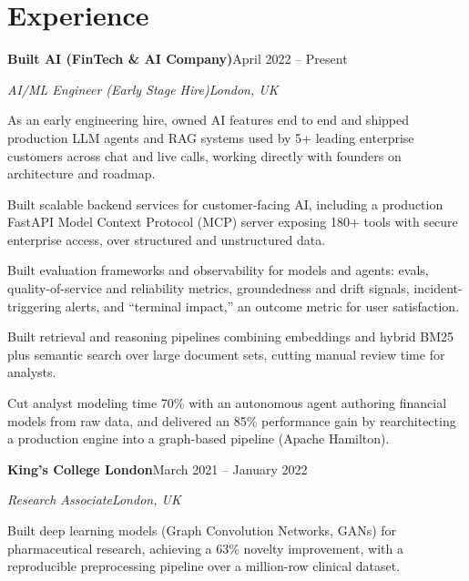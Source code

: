 \documentclass[10pt,a4paper]{article}
\newcommand{\entry}[4]{%
  {\color{company}\bfseries #1}\hfill {\color{muted}#2}\par
  \vspace{1pt}
  {\itshape #3}\hfill {\color{muted}\itshape #4}\par
  \vspace{3pt}%
}
\begin{document}
\section{Experience}
\entry{Built AI (FinTech \& AI Company)}{April 2022 -- Present}{AI/ML Engineer (Early Stage Hire)}{London, UK}
\begin{tight}
  \item As an early engineering hire, owned AI features end to end and shipped production LLM agents and RAG systems used by 5+ leading enterprise customers across chat and live calls, working directly with founders on architecture and roadmap.
  \item Built scalable backend services for customer-facing AI, including a production FastAPI Model Context Protocol (MCP) server exposing 180+ tools with secure enterprise access, over structured and unstructured data.
  \item Built evaluation frameworks and observability for models and agents: evals, quality-of-service and reliability metrics, groundedness and drift signals, incident-triggering alerts, and ``terminal impact,'' an outcome metric for user satisfaction.
  \item Built retrieval and reasoning pipelines combining embeddings and hybrid BM25 plus semantic search over large document sets, cutting manual review time for analysts.
  \item Cut analyst modeling time 70\% with an autonomous agent authoring financial models from raw data, and delivered an 85\% performance gain by rearchitecting a production engine into a graph-based pipeline (Apache Hamilton).
\end{tight}

\entry{King's College London}{March 2021 -- January 2022}{Research Associate}{London, UK}
\begin{tight}
  \item Built deep learning models (Graph Convolution Networks, GANs) for pharmaceutical research, achieving a 63\% novelty improvement, with a reproducible preprocessing pipeline over a million-row clinical dataset.
\end{tight}

\end{document}
